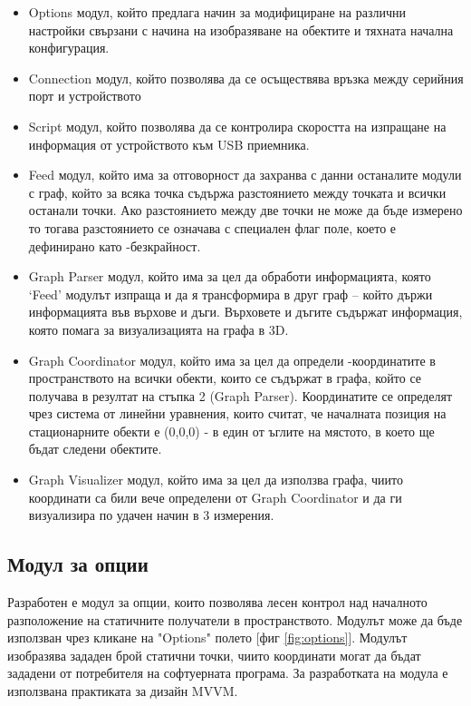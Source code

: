 \begin{itemize}
    \item Options модул, който предлага начин за модифициране на различни настройки свързани с начина на изобразяване на обектите и тяхната начална конфигурация.
    \item Connection модул, който позволява да се осъществява връзка между серийния порт и устройството
    \item Script модул, който позволява да се контролира скоростта на изпращане на информация от устройството към USB приемника.
    \item Feed  модул, който има за отговорност да захранва с данни останалите модули с граф, който за всяка точка съдържа разстоянието между точката и всички останали точки. Ако разстоянието между две точки не може да бъде измерено то тогава разстоянието се означава с специален флаг поле, което е дефинирано като -безкрайност.
    \item Graph Parser модул, който има за цел да обработи информацията, която ‘Feed’ модулът изпраща и да я трансформира в друг граф – който държи информацията във върхове и дъги. Върховете и дъгите съдържат информация, която помага за визуализацията на графа в 3D.
    \item Graph Coordinator модул, който има за цел да определи -координатите в пространството на всички обекти, които се съдържат в графа, който се получава в резултат на стъпка 2 (Graph Parser). Координатите се определят чрез система от линейни уравнения, които считат, че началната позиция на стационарните обекти е (0,0,0) - в един от ъглите на мястото, в което ще бъдат следени обектите.
    \item Graph Visualizer модул, който има за цел да използва графа, чиито координати са били вече определени от Graph Coordinator и да ги визуализира по удачен начин в 3 измерения.

\end{itemize}

\pagebreak

\subsection{Модул за опции}
Разработен е модул за опции, които позволява лесен контрол над началното разположение на статичните получатели в пространството. Модулът може да бъде използван чрез кликане на "Options" полето [фиг \ref{fig:options}]. Модулът изобразява зададен брой статични точки, чиито координати могат да бъдат зададени от потребителя на софтуерната програма. За разработката на модула е използвана практиката за дизайн MVVM. 

